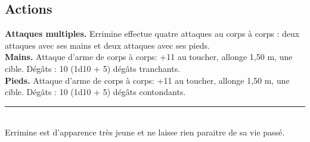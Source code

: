 \begin{figure*}[tb!]
{\begin{minipage}[c]{.45\linewidth}
    \subsection*{Actions}
    {\bfseries Attaques multiples.} Errimine effectue quatre attaques au corps à corps : deux attaques avec ses mains et deux attaques avec ses pieds. \\
    {\bfseries Mains.} Attaque d'arme de corps à corps: +11 au toucher, allonge 1,50 m, une cible. Dégâts : 10 (1d10 + 5) dégâts tranchants. \\
    {\bfseries Pieds.} Attaque d'arme de corps à corps: +11 au toucher, allonge 1,50 m, une cible. Dégâts : 10 (1d10 + 5) dégâts contondants. \\
   \noindent\rule{\textwidth}{1pt} \\
Errimine est d'apparence très jeune et ne laisse rien paraitre de sa vie passé.
 \end{minipage}
}%
\end{figure*}

